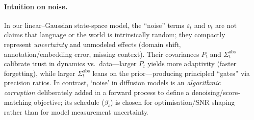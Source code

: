 \documentclass{article}
\begin{document}
\paragraph{Intuition on noise.}
In our linear--Gaussian state-space model, the ``noise'' terms \(\varepsilon_t\) and \(\nu_t\) are not claims that language or the world is intrinsically random; they compactly represent \emph{uncertainty} and unmodeled effects (domain shift, annotation/embedding error, missing context).
Their covariances \(P_t\) and \(\Sigma^{\mathrm{obs}}_t\) calibrate trust in dynamics vs.\ data---larger \(P_t\) yields more adaptivity (faster forgetting), while larger \(\Sigma^{\mathrm{obs}}_t\) leans on the prior---producing principled ``gates'' via precision ratios.
In contrast, `noise' in diffusion models is an \emph{algorithmic corruption} deliberately added in a forward process to define a denoising/score-matching objective; its schedule (\(\beta_t\)) is chosen for optimisation/SNR shaping rather than for model measurement uncertainty.




\newpage


\clearpage
\end{document}
